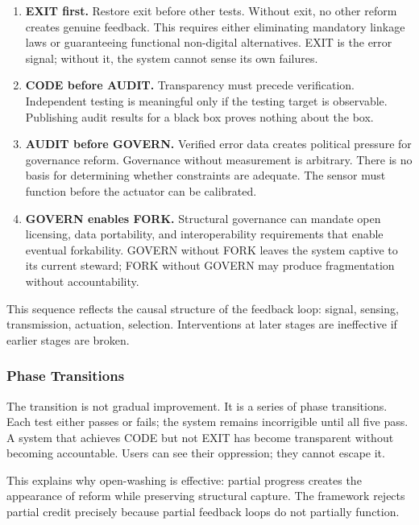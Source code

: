 \documentclass{article}
\begin{document}
\begin{enumerate}
    \item \textbf{EXIT first.} Restore exit before other tests. Without exit, no other reform creates genuine feedback. This requires either eliminating mandatory linkage laws or guaranteeing functional non-digital alternatives. EXIT is the error signal; without it, the system cannot sense its own failures.

    \item \textbf{CODE before AUDIT.} Transparency must precede verification. Independent testing is meaningful only if the testing target is observable. Publishing audit results for a black box proves nothing about the box.

    \item \textbf{AUDIT before GOVERN.} Verified error data creates political pressure for governance reform. Governance without measurement is arbitrary. There is no basis for determining whether constraints are adequate. The sensor must function before the actuator can be calibrated.

    \item \textbf{GOVERN enables FORK.} Structural governance can mandate open licensing, data portability, and interoperability requirements that enable eventual forkability. GOVERN without FORK leaves the system captive to its current steward; FORK without GOVERN may produce fragmentation without accountability.
\end{enumerate}

This sequence reflects the causal structure of the feedback loop: signal, sensing, transmission, actuation, selection. Interventions at later stages are ineffective if earlier stages are broken.

\subsubsection{Phase Transitions}

The transition is not gradual improvement. It is a series of phase transitions. Each test either passes or fails; the system remains incorrigible until all five pass. A system that achieves CODE but not EXIT has become transparent without becoming accountable. Users can see their oppression; they cannot escape it.

This explains why open-washing is effective: partial progress creates the appearance of reform while preserving structural capture. The framework rejects partial credit precisely because partial feedback loops do not partially function.
\end{document}
